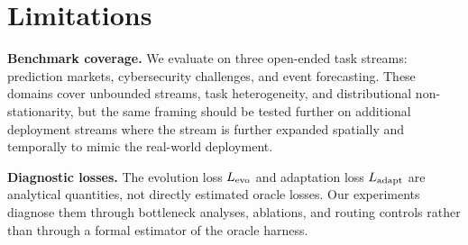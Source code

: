 
\section{Limitations}
\label{sec:limitations}

\noindent\textbf{Benchmark coverage.}
We evaluate on three open-ended task streams: prediction markets, cybersecurity challenges, and event forecasting. These domains cover unbounded streams, task heterogeneity, and distributional non-stationarity, but the same framing should be tested further on additional deployment streams where the stream is further expanded spatially and temporally to mimic the real-world deployment.

\noindent\textbf{Diagnostic losses.}
The evolution loss $L_{\text{evo}}$ and adaptation loss $L_{\text{adapt}}$ are analytical quantities, not directly estimated oracle losses. Our experiments diagnose them through bottleneck analyses, ablations, and routing controls rather than through a formal estimator of the oracle harness.
